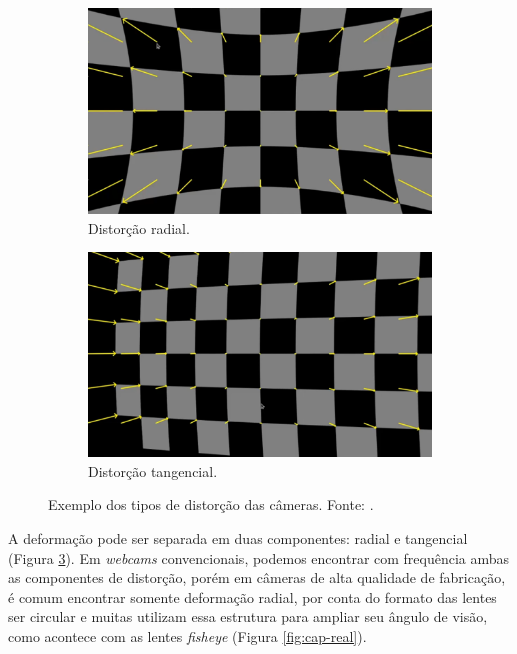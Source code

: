 \begin{figure}[H]
    \centering
    \begin{subfigure}{.45\textwidth}
        \centering
        \includegraphics[width=.95\linewidth]{figuras/DistortionRadial.png}
        \caption{Distorção radial.}
        \label{fig:radial}
    \end{subfigure}
    \begin{subfigure}{.45\textwidth}
        \centering
        \includegraphics[width=.95\linewidth]{figuras/DistortionTang.png}
        \caption{Distorção tangencial.}
        \label{fig:tangencial}
    \end{subfigure}
    \caption{Exemplo dos tipos de distorção das câmeras. Fonte: \cite{augmented-calib}.}
    \label{fig:distort-comp}
\end{figure}

A deformação pode ser separada em duas componentes: radial e tangencial (Figura \ref{fig:distort-comp}). Em \textit{webcams} convencionais, podemos encontrar com frequência ambas as componentes de distorção, porém em câmeras de alta qualidade de fabricação, é comum encontrar somente deformação radial, por conta do formato das lentes ser circular e muitas utilizam essa estrutura para ampliar seu ângulo de visão, como acontece com as lentes \textit{fisheye} (Figura \ref{fig:cap-real}). 

